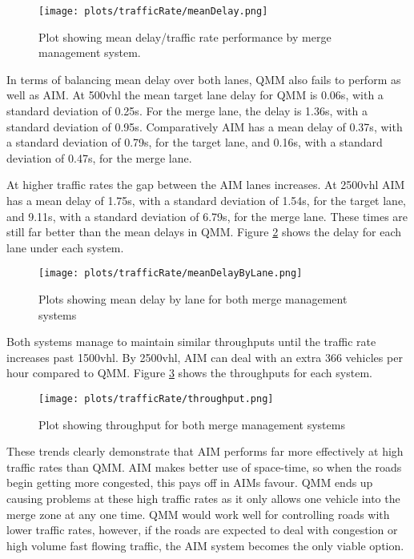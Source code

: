 \begin{figure}[htb]
\texttt{[image: plots/trafficRate/meanDelay.png]}
\caption{Plot showing mean delay/traffic rate performance by merge management system.}
\label{fig:meanDelayTrafficRate}
\end{figure}

In terms of balancing mean delay over both lanes, QMM also fails to perform as well as AIM. At 500\si{vhl} the mean target lane delay for QMM is 0.06\si{s}, with a standard deviation of 0.25\si{s}. For the merge lane, the delay is 1.36\si{s}, with a standard deviation of 0.95\si{s}. Comparatively AIM has a mean delay of 0.37\si{s}, with a standard deviation of 0.79\si{s}, for the target lane, and 0.16\si{s}, with a standard deviation of 0.47\si{s}, for the merge lane.

At higher traffic rates the gap between the AIM lanes increases. At 2500\si{vhl} AIM has a mean delay of 1.75\si{s}, with a standard deviation of 1.54\si{s}, for the target lane, and 9.11\si{s}, with a standard deviation of 6.79\si{s}, for the merge lane. These times are still far better than the mean delays in QMM. Figure \ref{fig:meanDelayByLaneTrafficRate} shows the delay for each lane under each system.

\begin{figure}[htb]
\centerline{
\texttt{[image: plots/trafficRate/meanDelayByLane.png]}
}
\caption{Plots showing mean delay by lane for both merge management systems}
\label{fig:meanDelayByLaneTrafficRate}
\end{figure}

Both systems manage to maintain similar throughputs until the traffic rate increases past 1500\si{vhl}. By 2500\si{vhl}, AIM can deal with an extra 366 vehicles per hour compared to QMM. Figure \ref{fig:throughputTrafficRate} shows the throughputs for each system.

\begin{figure}[htb]
\centering
\texttt{[image: plots/trafficRate/throughput.png]}
\caption{Plot showing throughput for both merge management systems}
\label{fig:throughputTrafficRate}
\end{figure}

These trends clearly demonstrate that AIM performs far more effectively at high traffic rates than QMM. AIM makes better use of space-time, so when the roads begin getting more congested, this pays off in AIMs favour. QMM ends up causing problems at these high traffic rates as it only allows one vehicle into the merge zone at any one time. QMM would work well for controlling roads with lower traffic rates, however, if the roads are expected to deal with congestion or high volume fast flowing traffic, the AIM system becomes the only viable option.


